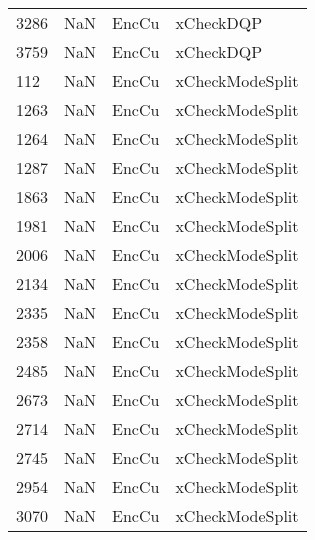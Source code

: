 \begin{tabular}{llll}
3286 &                   NaN &                      EncCu &                                 xCheckDQP \\
3759 &                   NaN &                      EncCu &                                 xCheckDQP \\
112  &                   NaN &                      EncCu &                           xCheckModeSplit \\
1263 &                   NaN &                      EncCu &                           xCheckModeSplit \\
1264 &                   NaN &                      EncCu &                           xCheckModeSplit \\
1287 &                   NaN &                      EncCu &                           xCheckModeSplit \\
1863 &                   NaN &                      EncCu &                           xCheckModeSplit \\
1981 &                   NaN &                      EncCu &                           xCheckModeSplit \\
2006 &                   NaN &                      EncCu &                           xCheckModeSplit \\
2134 &                   NaN &                      EncCu &                           xCheckModeSplit \\
2335 &                   NaN &                      EncCu &                           xCheckModeSplit \\
2358 &                   NaN &                      EncCu &                           xCheckModeSplit \\
2485 &                   NaN &                      EncCu &                           xCheckModeSplit \\
2673 &                   NaN &                      EncCu &                           xCheckModeSplit \\
2714 &                   NaN &                      EncCu &                           xCheckModeSplit \\
2745 &                   NaN &                      EncCu &                           xCheckModeSplit \\
2954 &                   NaN &                      EncCu &                           xCheckModeSplit \\
3070 &                   NaN &                      EncCu &                           xCheckModeSplit \\

\end{tabular}

